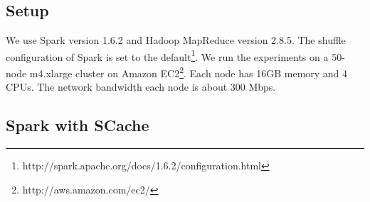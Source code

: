 

\subsection{Setup}\label{stepup}
We use Spark version 1.6.2 and Hadoop MapReduce version 2.8.5.
The shuffle configuration of Spark is set to the default\footnote{http://spark.apache.org/docs/1.6.2/configuration.html}. 
We run the experiments on a 50-node m4.xlarge cluster on Amazon EC2\footnote{http://aws.amazon.com/ec2/}. 
Each node has 16GB memory and 4 CPUs.
The network bandwidth each node is about 300 Mbps.

\subsection{Spark with SCache}\label{sparkscache}

